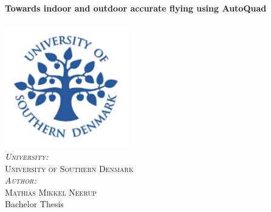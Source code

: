 \begin{titlepage}


\center %
 



\HRule \\[0.4cm]
{ \huge \textbf{ Towards indoor and outdoor accurate flying using AutoQuad }}\\[0.4cm] %

\HRule \\[1.5cm]
\includegraphics[width=0.4\textwidth]{University_of_Southern_Denmark-logo} \\
\textsc{\large \emph{University:} \\   University of Southern Denmark }\\[0.5cm] %
\textsc{\large \emph{Author:} \\ Mathias Mikkel Neerup }\\[0.5cm] %


\LARGE Bachelor Thesis\\[1.5cm] %
 


\end{titlepage}

